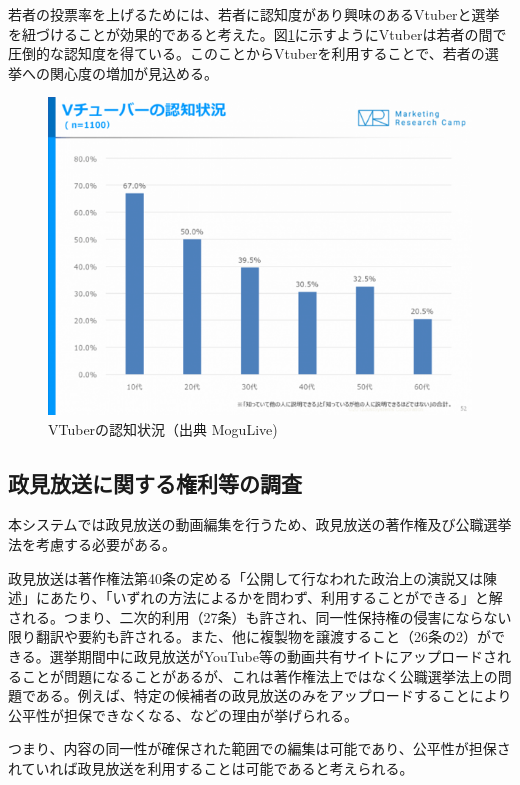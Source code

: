 \documentclass[a4paper,12pt]{jsarticle}
\begin{document}
若者の投票率を上げるためには、若者に認知度があり興味のあるVtuberと選挙を紐づけることが効果的であると考えた。図\ref{fig:vtuber}に示すようにVtuberは若者の間で圧倒的な認知度を得ている。このことからVtuberを利用することで、若者の選挙への関心度の増加が見込める。

\begin{figure}[H]
	\begin{center}
		\includegraphics[width=12.0cm]{fig/vtube.png}
		\caption{VTuberの認知状況（出典 MoguLive\cite{vtuber})}
		\label{fig:vtuber}
	\end{center}
\end{figure}

\subsection{政見放送に関する権利等の調査}

本システムでは政見放送の動画編集を行うため、政見放送の著作権及び公職選挙法を考慮する必要がある。

政見放送は著作権法第40条の定める「公開して行なわれた政治上の演説又は陳述」にあたり、「いずれの方法によるかを問わず、利用することができる」と解される。つまり、二次的利用（27条）も許され、同一性保持権の侵害にならない限り翻訳や要約も許される。また、他に複製物を譲渡すること（26条の2）ができる\cite{law}。選挙期間中に政見放送がYouTube等の動画共有サイトにアップロードされることが問題になることがあるが、これは著作権法上ではなく公職選挙法上の問題である。例えば、特定の候補者の政見放送のみをアップロードすることにより公平性が担保できなくなる、などの理由が挙げられる\cite{wiki}。

つまり、内容の同一性が確保された範囲での編集は可能であり、公平性が担保されていれば政見放送を利用することは可能であると考えられる。
\end{document}
